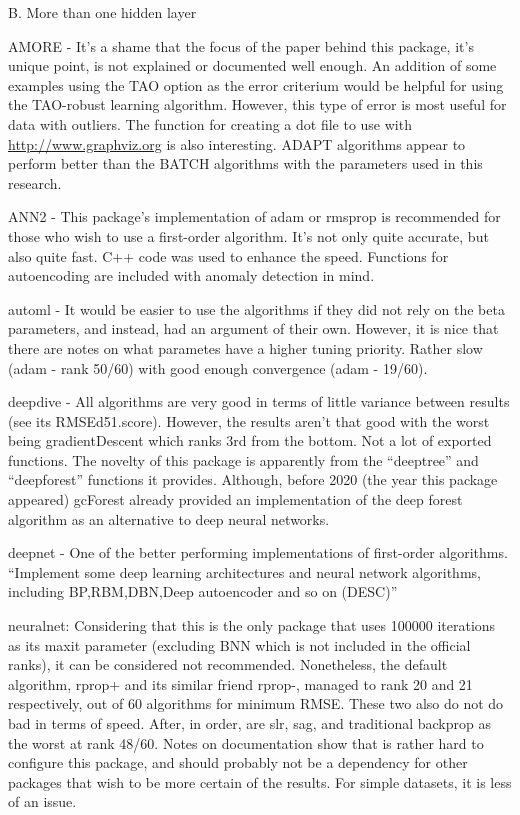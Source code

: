 B. More than one hidden layer

AMORE - It's a shame that the focus of the paper behind this package,
it's unique point, is not explained or documented well enough. An
addition of some examples using the TAO option as the error criterium
would be helpful for using the TAO-robust learning algorithm. However,
this type of error is most useful for data with outliers. The function
for creating a dot file to use with \url{http://www.graphviz.org} is
also interesting. ADAPT algorithms appear to perform better than the
BATCH algorithms with the parameters used in this research.

ANN2 - This package's implementation of adam or rmsprop is recommended
for those who wish to use a first-order algorithm. It's not only quite
accurate, but also quite fast. C++ code was used to enhance the speed.
Functions for autoencoding are included with anomaly detection in mind.

automl - It would be easier to use the algorithms if they did not rely
on the beta parameters, and instead, had an argument of their own.
However, it is nice that there are notes on what parametes have a higher
tuning priority. Rather slow (adam - rank 50/60) with good enough
convergence (adam - 19/60).

deepdive - All algorithms are very good in terms of little variance
between results (see its RMSEd51.score). However, the results aren't
that good with the worst being gradientDescent which ranks 3rd from the
bottom. Not a lot of exported functions. The novelty of this package is
apparently from the ``deeptree'' and ``deepforest'' functions it
provides. Although, before 2020 (the year this package appeared)
gcForest already provided an implementation of the deep forest algorithm
as an alternative to deep neural networks.

deepnet - One of the better performing implementations of first-order
algorithms. ``Implement some deep learning architectures and neural
network algorithms, including BP,RBM,DBN,Deep autoencoder and so on
(DESC)''

neuralnet: Considering that this is the only package that uses 100000
iterations as its maxit parameter (excluding BNN which is not included
in the official ranks), it can be considered not recommended.
Nonetheless, the default algorithm, rprop+ and its similar friend
rprop-, managed to rank 20 and 21 respectively, out of 60 algorithms for
minimum RMSE. These two also do not do bad in terms of speed. After, in
order, are slr, sag, and traditional backprop as the worst at rank
48/60. Notes on documentation show that is rather hard to configure this
package, and should probably not be a dependency for other packages that
wish to be more certain of the results. For simple datasets, it is less
of an issue.

